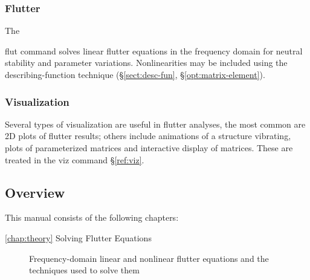 \documentclass[11pt,openany,twoside]{book}
\numberwithin{equation}{section}		%
\newcommand{\Cmd}[1]{{\sf #1}}
\newcommand{\Code}[1]{{\small\tt #1}}
\newcommand{\Flaps}{\textsc{Flaps\:}}
\newcommand{\Sectref}[1]{\S\ref{#1}}
\begin{document}
\subsubsection{Flutter}
The {\Cmd{flut} command solves linear flutter equations
in the frequency domain for neutral stability and parameter
variations.
Nonlinearities may be included using the describing-function
technique (\Sectref{sect:desc-fun}, \Sectref{opt:matrix-element}).
        
\subsubsection{Visualization}
Several types of visualization are useful in flutter analyses,
the most common are 2D plots of flutter results;
others include animations of a structure vibrating, plots of
parameterized matrices and interactive display of matrices.
These are treated in the \Cmd{viz} command \Sectref{ref:viz}.




\subsection{Overview}
This manual consists of the following chapters:

\begin{description}
	\item[\ref{chap:theory} Solving Flutter Equations]
	Frequency-domain linear and nonlinear flutter equations and
	the techniques used to solve them


\end{description}}
\end{document}
